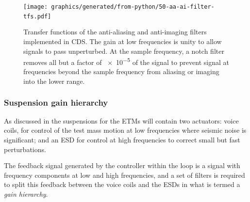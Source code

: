 \begin{figure}
  \centering
  \texttt{[image: graphics/generated/from-python/50-aa-ai-filter-tfs.pdf]}
  \caption[Anti-aliasing and anti-imaging filter transfer functions]{\label{fig:aa-ai-filter-tfs}Transfer functions of the anti-aliasing and anti-imaging filters implemented in CDS. The gain at low frequencies is unity to allow signals to pass unperturbed. At the sample frequency, a notch filter removes all but a factor of \SI{e-5}{} of the signal to prevent signal at frequencies beyond the sample frequency from aliasing or imaging into the lower range.}
\end{figure}

\subsubsection{\label{sec:sus-gain-hierarchy}Suspension gain hierarchy}

As discussed in  the suspensions for the \glspl{ETM} will contain two actuators: voice coils, for control of the test mass motion at low frequencies where seismic noise is significant; and an \gls{ESD} for control at high frequencies to correct small but fast perturbations.

The feedback signal generated by the controller within the loop is a signal with frequency components at low and high frequencies, and a set of filters is required to split this feedback between the voice coils and the \glspl{ESD} in what is termed a \emph{gain hierarchy}.

